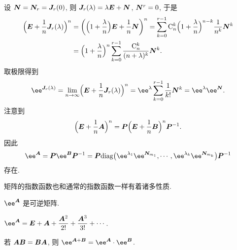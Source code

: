 设 ${\boldsymbol{N}}={\boldsymbol{N}}_r={\boldsymbol{J}}_r(0)$, 则 ${\boldsymbol{J}}_r(\lambda)=\lambda{\boldsymbol{E}}+{\boldsymbol{N}}$, ${\boldsymbol{N}}^r=0$, 于是
\begin{align*}
   \Bigl({\boldsymbol{E}}+\frac1n {\boldsymbol{J}}_r(\lambda)\Bigr)^n&
  =\biggl(\Bigl(1+\frac \lambda n\Bigr){\boldsymbol{E}}+\frac1n {\boldsymbol{N}}\biggr)^n
  =\sum_{k=0}^{r-1} {\mathrm{C}}_n^k \Bigl(1+\frac \lambda n\Bigr)^{n-k} \frac1{n^k} {\boldsymbol{N}}^k\\&
  =\Bigl(1+\frac \lambda n\Bigr)^n \sum_{k=0}^{r-1} \frac{{\mathrm{C}}_n^k}{(n+\lambda)^k}{\boldsymbol{N}}^k.
\end{align*}
取极限得到
\begin{equation}
  \label{eq:jordan-exponential}
   \ee^{\bfJ_r(\lambda)}
  =\lim_{n\ra \infty}\Bigl(\bfE+\frac1n \bfJ_r(\lambda)\Bigr)^n
  =\ee^\lambda\sum_{k=0}^{r-1} \frac1{k!}\bfN^k
  =\ee^\lambda\ee^\bfN.
\end{equation}
注意到 
\[
   \Bigl({\boldsymbol{E}}+\frac1n {\boldsymbol{A}}\Bigr)^n
  ={\boldsymbol{P}}\Bigl({\boldsymbol{E}}+\frac1n {\boldsymbol{B}}\Bigr)^n{\boldsymbol{P}}^{-1}.
\]
因此
\begin{equation}
  \label{eq:matrix-exponential}
  \ee^\bfA=\bfP\ee^{\bfB}\bfP^{-1}
  =\bfP\diag\bigl(
      \ee^{\lambda_1}\ee^{\bfN_{m_1}},\cdots,
      \ee^{\lambda_k}\ee^{\bfN_{m_k}}
    \bigr)\bfP^{-1}
\end{equation}
存在.

矩阵的指数函数也和通常的指数函数一样有着诸多性质.

\begin{theorem}
  \begin{enuma}
    \item $\ee^\bfA$ 是可逆矩阵.
    \item $\ee^\bfA=\bfE+\bfA+\dfrac{\bfA^2}{2!}+\dfrac{\bfA^3}{3!}+\cdots$.
    \label{enum:power-series-matrix-exp}
    \item 若 ${\boldsymbol{A}}{\boldsymbol{B}}={\boldsymbol{B}}{\boldsymbol{A}}$, 则 $\ee^{\bfA+\bfB}=\ee^\bfA\cdot \ee^\bfB$.
  \end{enuma}
\end{theorem}

